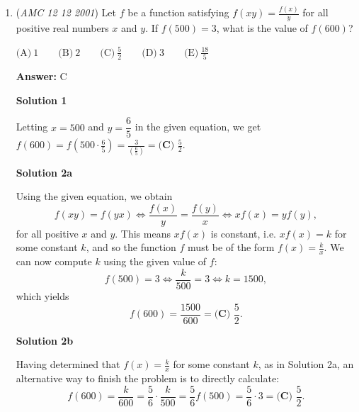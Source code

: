 \begin{enumerate}
 



\textbf{Solution 2}

As in Solution 1, we deduce that the slant height of the cone is $10$.

 We now recall that the lateral surface area of a cone with base radius $r$ and slant height $l$ is $\pi rl$, while the area of the sector is $\frac{252^{\circ}}{360^{\circ}} \cdot \pi \cdot 10^2 = \frac{7}{10} \cdot \pi \cdot 10^2 = 70\pi$. We must therefore have 
 \[\pi \cdot r \cdot 10 = 70\pi \iff 10r = 70 \iff r = 7,\] so the answer is $\boxed{\textbf{(C)} \text{ A cone with slant height of } 10 \text{ and radius } 7}$.

 -mathlover1205 -formatted and improved by Sevenoptimus

 


	\item (\textit{AMC 12 12 2001}) Let $f$ be a function satisfying $f(xy) = \frac{f(x)}y$ for all positive real numbers $x$ and $y$. If $f(500) =3$, what is the value of $f(600)$?


 $\text{(A)}\ 1 \qquad \text{(B)}\ 2 \qquad \text{(C)}\ \frac52 \qquad \text{(D)}\ 3 \qquad \text{(E)}\ \frac{18}5$

 \textbf{Answer: }C



\textbf{Solution 1}

Letting $x = 500$ and $y = \dfrac{6}{5}$ in the given equation, we get $f(600) = f(500\cdot\frac{6}{5}) = \frac{3}{\left(\frac{6}{5}\right)} = \boxed{\textbf{(C) } \frac{5}{2}}$.

 



\textbf{Solution 2a}

Using the given equation, we obtain 
 \[f(xy) = f(yx) \iff \frac{f(x)}{y} = \frac{f(y)}{x} \iff xf(x) = yf(y),\] for all positive $x$ and $y$. This means $xf(x)$ is constant, i.e. $xf(x) = k$ for some constant $k$, and so the function $f$ must be of the form $f(x) = \frac{k}{x}$. We can now compute $k$ using the given value of $f$: 
 \[f(500) = 3 \iff \frac{k}{500} = 3 \iff k = 1500,\] which yields 
 \[f(600) = \frac{1500}{600} = \boxed{\textbf{(C) } \frac{5}{2}}.\]




\textbf{Solution 2b}

Having determined that $f(x) = \frac{k}{x}$ for some constant $k$, as in Solution 2a, an alternative way to finish the problem is to directly calculate: 
 \[f(600) = \frac{k}{600} = \frac{5}{6}\cdot\frac{k}{500} = \frac{5}{6}f(500) = \frac{5}{6} \cdot 3 = \boxed{\textbf{(C) } \frac{5}{2}}.\]





\end{enumerate}
